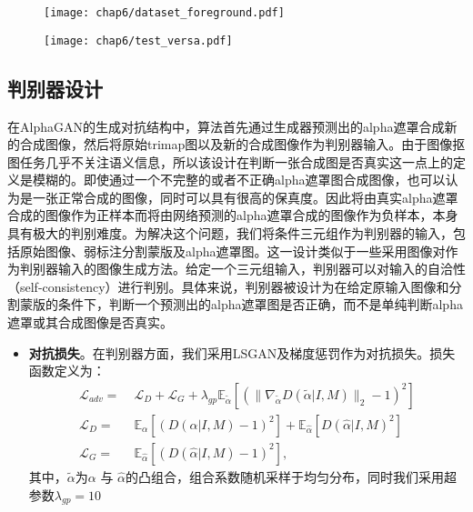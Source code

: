 \begin{figure}[t]
	\centering
	\texttt{[image: chap6/dataset\_foreground.pdf]}
	\label{fig6:foreground}
\end{figure}

\begin{figure}[t]
	\centering
	\texttt{[image: chap6/test\_versa.pdf]}
	\label{fig6:test-data}
\end{figure}

\subsection{判别器设计}
在AlphaGAN\cite{lutz2018alphagan}的生成对抗结构中，算法首先通过生成器预测出的alpha遮罩合成新的合成图像，然后将原始trimap图以及新的合成图像作为判别器输入。由于图像抠图任务几乎不关注语义信息，所以该设计在判断一张合成图是否真实这一点上的定义是模糊的。即使通过一个不完整的或者不正确alpha遮罩图合成图像，也可以认为是一张正常合成的图像，同时可以具有很高的保真度。因此将由真实alpha遮罩合成的图像作为正样本而将由网络预测的alpha遮罩合成的图像作为负样本，本身具有极大的判别难度。为解决这个问题，我们将条件三元组作为判别器的输入，包括原始图像、弱标注分割蒙版及alpha遮罩图。这一设计类似于一些采用图像对作为判别器输入的图像生成方法\cite{hu2018pose}。给定一个三元组输入，判别器可以对输入的自洽性（self-consistency）进行判别。具体来说，判别器被设计为在给定原输入图像和分割蒙版的条件下，判断一个预测出的alpha遮罩图是否正确，而不是单纯判断alpha遮罩或其合成图像是否真实。

\begin{itemize}
	\item \textbf{对抗损失}。在判别器方面，我们采用LSGAN\cite{mao2017least}及梯度惩罚\cite{gulrajani2017improved}作为对抗损失。损失函数定义为：
	\begin{equation}
	\begin{aligned}
	\mathcal{L}_{adv} =\; & \mathcal{L}_D + \mathcal{L}_G + \lambda_{gp}  \mathbb{E}_{\tilde{\alpha}}[(\|\nabla_{\tilde{\alpha}}D(\tilde{\alpha}|I, M)\|_2-1)^2]\\
	\mathcal{L}_D =\; & \mathbb{E}_\alpha[(D(\alpha|I, M)-1)^2] + \mathbb{E}_{\hat{\alpha}}[D(\hat{\alpha}|I, M)^2]\\
	\mathcal{L}_G =\; & \mathbb{E}_{\hat{\alpha}}[(D(\hat{\alpha}|I, M)-1)^2],
	\end{aligned}
	\end{equation}
	其中，$ \tilde{\alpha} $为$ \alpha $ 与 $ \hat{\alpha} $的凸组合，组合系数随机采样于均匀分布，同时我们采用超参数$ \lambda_{gp} =10 $
\end{itemize}

